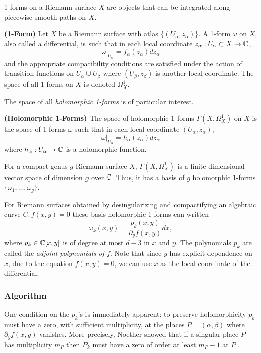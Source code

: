 1-forms on a Riemann surface $X$ are objects that can be integrated
along piecewise smooth paths on $X$.
\begin{definition}
  {\bf (1-Form)} Let $X$ be a Riemann surface with atlas $\{ (U_\alpha,
  z_\alpha) \}$. A 1-form $\omega$ on $X$, also called a differential,
  is such that in each local coordinate $z_\alpha : U_\alpha \subset X
  \to \operatorname{\mathbb{C}}$,
  \[
      \omega \Big|_{U_\alpha} = f_\alpha(z_\alpha) dz_\alpha
  \]
  and the appropriate compatibility conditions are satisfied under the
  action of transition functions on $U_\alpha \cup U_\beta$ where
  $(U_\beta, z_\beta)$ is another local coordinate. The space of all
  1-forms on $X$ is denoted $\Omega_X^1$.
\end{definition}
The space of all {\it holomorphic 1-forms} is of particular interest.
\begin{definition}
  {\bf (Holomorphic 1-Forms)} The space of holomorphic 1-forms
  $\Gamma(X,\Omega_X^1)$ on $X$ is the space of 1-forms $\omega$ such
  that in each local coordinate $(U_\alpha, z_\alpha)$,
  \[
      \omega \Big|_{U_\alpha} = h_\alpha(z_\alpha) dz_\alpha
  \]
  where $h_\alpha : U_\alpha \to \operatorname{\mathbb{C}}$ is a holomorphic function.
\end{definition}
For a compact genus $g$ Riemann surface $X$, $\Gamma(X,\Omega_X^1)$ is a
finite-dimensional vector space of dimension $g$ over $\operatorname{\mathbb{C}}$. Thus, it
has a basis of $g$ holomorphic 1-forms $\{\omega_1, \ldots, \omega_g\}$.

For Riemann surfaces obtained by desingularizing and compactifying an
algebraic curve $C : f(x,y) = 0$ these basis holomorphic 1-forms can
written
\begin{equation*}
  \omega_k(x,y) = \frac{p_k(x,y)}{\partial_y f(x,y)} dx,
\end{equation*}
where $p_k \in \operatorname{\mathbb{C}}[x,y]$ is of degree at most $d-3$ in $x$ and $y$. The
polynomials $p_k$ are called the {\it adjoint polynomials of $f$}. Note
that since $y$ has explicit dependence on $x$, due to the equation
$f(x,y) = 0$, we can use $x$ as the local coordinate of the
differential.

%
\subsubsection*{Algorithm}
%

One condition on the $p_k$'s is immediately apparent: to preserve
holomorphicity $p_k$ must have a zero, with sufficient multiplicity, at
the places $P = (\alpha,\beta)$ where $\partial_y f(x,y)$ vanishes. More
precisely, Noether showed that if a singular place $P$ has multiplicity
$m_P$ then $P_k$ must have a zero of order at least $m_P - 1$ at $P$
\cite{Noether83}.

